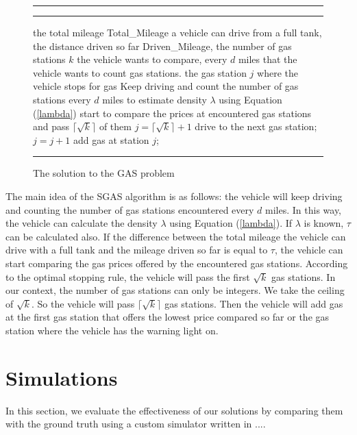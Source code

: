 \documentclass[conference]{IEEEtran}
\theoremstyle{definition}
\begin{document}
\begin{figure}[!hbt]
\vspace{0.2cm}
\hrule \medskip {} \smallskip
\hrule
\smallskip
\begin{algorithmic}[1]
 the total mileage Total\_Mileage a vehicle can drive from a full tank, the distance driven so far Driven\_Mileage, the number of gas stations $k$ the vehicle wants to compare, every $d$ miles that the vehicle wants to count gas stations.
 the gas station $j$ where the vehicle stops for gas
\STATE Keep driving and count the number of gas stations every $d$ miles to estimate density $\lambda$ using Equation (\ref{lambda})
\ENDWHILE
{}
\STATE start to compare the prices at encountered gas stations and pass $\lceil\sqrt{k}\rceil$ of them
\ENDIF
\STATE $j = \lceil\sqrt{k}\rceil + 1$
\STATE drive to the next gas station; $j = j+1$
\ENDWHILE
\STATE add gas at station $j$;
\end{algorithmic}
\hrule
\caption{The solution to the GAS problem}
\label{SGAS}
\end{figure}

The main idea of the SGAS algorithm is as follows: the vehicle will keep driving and counting the number of gas stations encountered every $d$ miles. In this way, the vehicle can calculate the density $\lambda$ using Equation (\ref{lambda}). If $\lambda$ is known, $\tau$ can be calculated also. If the difference between the total mileage the vehicle can drive with a full tank and the mileage driven so far is equal to $\tau$, the vehicle can start comparing the gas prices offered by the encountered gas stations. According to the optimal stopping rule, the vehicle will pass the first $\sqrt{k}$ gas stations. In our context, the number of gas stations can only be integers. We take the ceiling of $\sqrt{k}$. So the vehicle will pass $\lceil\sqrt{k}\rceil$ gas stations. Then the vehicle will add gas at the first gas station that offers the lowest price compared so far or the gas station where the vehicle has the warning light on.

\section{Simulations} \label{simulations}
In this section, we evaluate the effectiveness of our solutions by comparing them with the ground truth using a custom simulator written in ....
\end{document}
